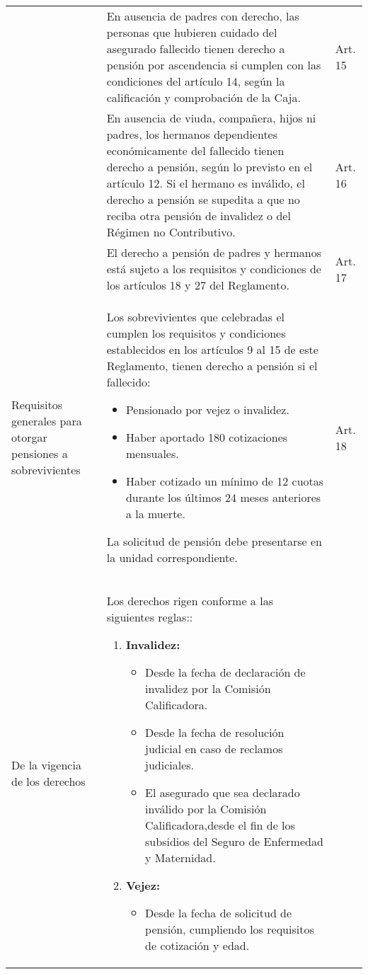 \documentclass[
]{article}
\begin{document}
\begin{longtable}{|m{4cm}|m{10cm}|m{1.5cm}|}
\cline{2-3}
 & En ausencia de padres con derecho, las personas que hubieren cuidado del asegurado fallecido tienen derecho a pensión por ascendencia si cumplen con las condiciones del artículo 14, según la calificación y comprobación de la Caja. & Art. 15 \\
\cline{2-3}
 & En ausencia de viuda, compañera, hijos ni padres, los hermanos dependientes económicamente del fallecido tienen derecho a pensión, según lo previsto en el artículo 12. Si el hermano es inválido, el derecho a pensión se supedita a que no reciba otra pensión de invalidez o del Régimen no Contributivo. & Art. 16 \\
\cline{2-3}
 & El derecho a pensión de padres y hermanos está sujeto a los requisitos y condiciones de los artículos 18 y 27 del Reglamento. & Art. 17 \\
\hline
Requisitos generales para otorgar pensiones a sobrevivientes & Los sobrevivientes que celebradas el  cumplen los requisitos y condiciones establecidos en los artículos 9 al 15 de este Reglamento, tienen derecho a pensión si el fallecido:
\begin{itemize}
    \item Pensionado por vejez o invalidez.
    \item Haber aportado 180 cotizaciones mensuales.
    \item Haber cotizado un mínimo de 12 cuotas durante los últimos 24 meses anteriores a la muerte.
\end{itemize}
La solicitud de pensión debe presentarse en la unidad correspondiente. & Art. 18 \\
\hline
De la vigencia de los derechos & Los derechos rigen conforme a las siguientes reglas::
\begin{enumerate}
    \item \textbf{Invalidez:}
    \begin{itemize}
        \item Desde la fecha de declaración de invalidez por la Comisión Calificadora.
        \item Desde la fecha de resolución judicial en caso de reclamos judiciales.
        \item El asegurado que sea declarado inválido por la Comisión Calificadora,desde el fin de los subsidios del Seguro de Enfermedad y Maternidad.
    \end{itemize}
    \item \textbf{Vejez:}
    \begin{itemize}
        \item Desde la fecha de solicitud de pensión, cumpliendo los requisitos de cotización y edad.

\end{itemize}
\end{enumerate}
\end{longtable}
\end{document}
